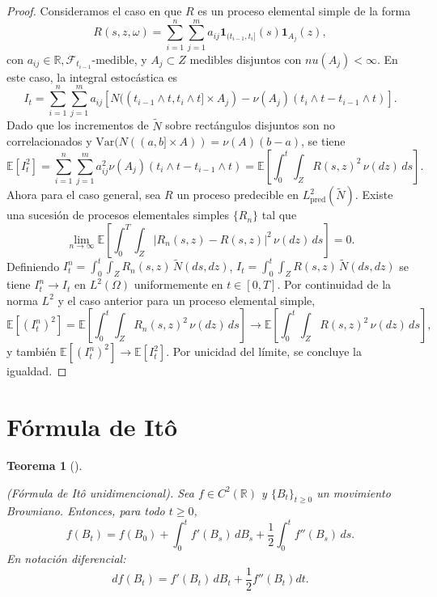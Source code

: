 \documentclass[
  spanish,
  us-letterpaper,
]{scrreprt}
\theoremstyle{plain}
\newtheorem{theorem}{Teorema}[chapter]
\theoremstyle{plain}
\theoremstyle{definition}
\theoremstyle{remark}
\begin{document}
\begin{proof}
Consideramos el caso en que \(R\) es un proceso elemental simple de la
forma
\[R(s,z,\omega) = \sum_{i=1}^{n} \sum_{j=1}^{m} a_{ij} \mathbf{1}_{(t_{i-1}, t_i]}(s) \mathbf{1}_{A_j}(z),\]
con \(a_{ij} \in \mathbb{R}, \mathcal{F}_{t_{i-1}}\text{-medible}\), y
\(A_j \subset Z\) medibles disjuntos con \(nu(A_j) < \infty\). En este
caso, la integral estocástica es
\[I_t = \sum_{i=1}^{n} \sum_{j=1}^{m} a_{ij} \left[ N((t_{i-1} \wedge t, t_i \wedge t] \times A_j) - \nu(A_j)(t_i \wedge t - t_{i-1} \wedge t) \right].\]
Dado que los incrementos de \(\widetilde{N}\) sobre rectángulos
disjuntos son no correlacionados y
\(\mathrm{Var}(N((a,b] \times A)) = \nu(A)(b-a)\), se tiene
\[\mathbb{E}[I_t^2] = \sum_{i=1}^{n} \sum_{j=1}^{m} a_{ij}^2 \nu(A_j)(t_i \wedge t - t_{i-1} \wedge t) = \mathbb{E}\left[ \int_0^t \int_Z R(s,z)^2 \, \nu(dz) \, ds \right].\]
Ahora para el caso general, sea \(R\) un proceso predecible en
\(L^2_{\text{pred}}(\widetilde{N})\). Existe una sucesión de procesos
elementales simples \(\{R_n\}\) tal que
\[\lim_{n\to\infty} \mathbb{E}\left[ \int_0^T \int_Z |R_n(s,z) - R(s,z)|^2 \, \nu(dz) \, ds \right] = 0.\]
Definiendo \(I_t^n = \int_0^t \int_Z R_n(s,z) \, \widetilde{N}(ds,dz)\),
\(I_t = \int_0^t \int_Z R(s,z) \, \widetilde{N}(ds,dz)\) se tiene
\(I_t^n \to I_t\) en \(L^2(\Omega)\) uniformemente en \(t\in[0,T]\). Por
continuidad de la norma \(L^2\) y el caso anterior para un proceso
elemental simple,
\[\mathbb{E}[(I_t^n)^2] = \mathbb{E}\left[ \int_0^t \int_Z R_n(s,z)^2 \, \nu(dz) \, ds \right] \to \mathbb{E}\left[ \int_0^t \int_Z R(s,z)^2 \, \nu(dz) \, ds \right],\]
y también \(\mathbb{E}[(I_t^n)^2] \to \mathbb{E}[I_t^2]\). Por unicidad
del límite, se concluye la igualdad.
\end{proof}

\section{Fórmula de Itô}\label{fuxf3rmula-de-ituxf4}

\begin{theorem}[]\protect\hypertarget{thm-Formula_ito_unidimen}{}\label{thm-Formula_ito_unidimen}

(Fórmula de Itô unidimencional). Sea \(f \in C^2(\mathbb{R})\) y
\(\{B_t\}_{t \geq 0}\) un movimiento Browniano. Entonces, para todo
\(t \geq 0\),
\[f(B_t) = f(B_0) + \int_0^t f'(B_s) \, dB_s + \frac{1}{2} \int_0^t f''(B_s) \, ds.\]
En notación diferencial:
\[df(B_t) = f'(B_t) \, dB_t + \frac{1}{2} f''(B_t) dt.\]

\end{theorem}
\end{document}
